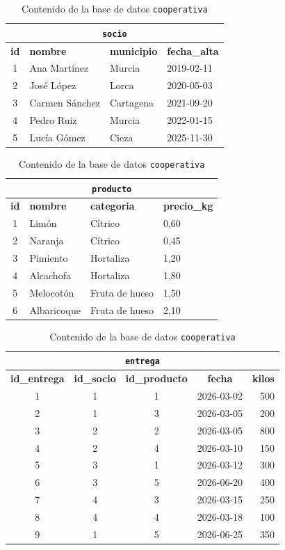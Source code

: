 \documentclass[11pt,a4paper]{article}
\begin{document}
\begin{table}[H]
\centering\small
\begin{tabular}{@{}clll@{}}
\toprule
\multicolumn{4}{c}{\texttt{socio}} \\
\midrule
\textbf{id} & \textbf{nombre} & \textbf{municipio} & \textbf{fecha\_alta} \\
1 & Ana Martínez   & Murcia    & 2019-02-11 \\
2 & José López     & Lorca     & 2020-05-03 \\
3 & Carmen Sánchez & Cartagena & 2021-09-20 \\
4 & Pedro Ruiz     & Murcia    & 2022-01-15 \\
5 & Lucía Gómez    & Cieza     & 2025-11-30 \\
\bottomrule
\end{tabular}
\hfill
\begin{tabular}{@{}clll@{}}
\toprule
\multicolumn{4}{c}{\texttt{producto}} \\
\midrule
\textbf{id} & \textbf{nombre} & \textbf{categoria} & \textbf{precio\_kg} \\
1 & Limón       & Cítrico        & 0,60 \\
2 & Naranja     & Cítrico        & 0,45 \\
3 & Pimiento    & Hortaliza      & 1,20 \\
4 & Alcachofa   & Hortaliza      & 1,80 \\
5 & Melocotón   & Fruta de hueso & 1,50 \\
6 & Albaricoque & Fruta de hueso & 2,10 \\
\bottomrule
\end{tabular}

\vspace{0.4cm}
\begin{tabular}{@{}ccccr@{}}
\toprule
\multicolumn{5}{c}{\texttt{entrega}} \\
\midrule
\textbf{id\_entrega} & \textbf{id\_socio} & \textbf{id\_producto} & \textbf{fecha} & \textbf{kilos} \\
1 & 1 & 1 & 2026-03-02 & 500 \\
2 & 1 & 3 & 2026-03-05 & 200 \\
3 & 2 & 2 & 2026-03-05 & 800 \\
4 & 2 & 4 & 2026-03-10 & 150 \\
5 & 3 & 1 & 2026-03-12 & 300 \\
6 & 3 & 5 & 2026-06-20 & 400 \\
7 & 4 & 3 & 2026-03-15 & 250 \\
8 & 4 & 4 & 2026-03-18 & 100 \\
9 & 1 & 5 & 2026-06-25 & 350 \\
\bottomrule
\end{tabular}
\caption{Contenido de la base de datos \texttt{cooperativa}}
\label{tab:datos}
\end{table}
\end{document}
